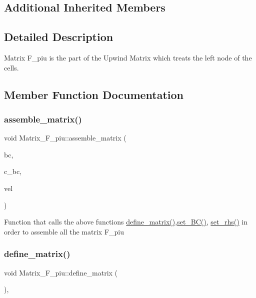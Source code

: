 \subsection*{Additional Inherited Members}


\subsection{Detailed Description}
Matrix F\+\_\+piu is the part of the Upwind Matrix which treats the left node of the cells. 

\subsection{Member Function Documentation}
\mbox{\label{classMatrix__F__piu_a1c640185a5b427345d92e76c82b78f70}} 
\subsubsection{\texorpdfstring{assemble\+\_\+matrix()}{assemble\_matrix()}}
{\footnotesize\ttfamily void Matrix\+\_\+\+F\+\_\+piu\+::assemble\+\_\+matrix (\begin{DoxyParamCaption}\item[{const std\+::string \&}]{bc,  }\item[{double}]{c\+\_\+bc,  }\item[{const Eigen\+::\+Vector\+Xd \&}]{vel }\end{DoxyParamCaption})}

Function that calls the above functions \hyperlink{classMatrix__F__piu_a137056684d91ecfac671f22518780d47}{define\+\_\+matrix()},\hyperlink{classMatrix__F__piu_afa51e1c04b403a491178bbeda322ce9d}{set\+\_\+\+B\+C()}, \hyperlink{classMatrix__F__piu_a174bfb860e79ad913fef24202d3ce96d}{set\+\_\+rhs()} in order to assemble all the matrix F\+\_\+piu \mbox{\label{classMatrix__F__piu_a137056684d91ecfac671f22518780d47}} 
\subsubsection{\texorpdfstring{define\+\_\+matrix()}{define\_matrix()}}
{\footnotesize\ttfamily void Matrix\+\_\+\+F\+\_\+piu\+::define\+\_\+matrix (\begin{DoxyParamCaption}{ }\end{DoxyParamCaption})\hspace{0.3cm}{\ttfamily [override]}, {\ttfamily [virtual]}}

